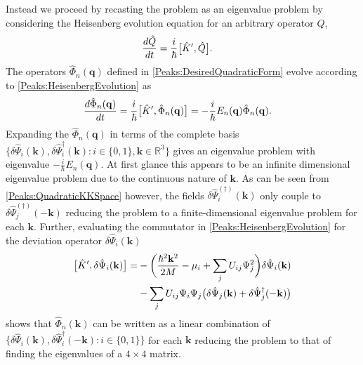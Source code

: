 Instead we proceed by recasting the problem as an eigenvalue problem by considering the Heisenberg evolution equation for an arbitrary operator $\hat{Q}$,
\begin{align}
    \frac{d \hat{Q}}{dt} &= \frac{i}{\hbar}\comm{\hat{K}', \hat{Q}}. \label{Peaks:HeisenbergEvolution}
\end{align}
The operators $\hat{\Phi}_n(\mathbf{q})$ defined in \eqref{Peaks:DesiredQuadraticForm} evolve according to \eqref{Peaks:HeisenbergEvolution} as
\begin{align}
    \frac{d \hat{\Phi}_n(\mathbf{q})}{dt} &= \frac{i}{\hbar}\big[\hat{K}', \hat{\Phi}_n(\mathbf{q})\big] = - \frac{i}{\hbar} E_n(\mathbf{q}) \hat{\Phi}_n(\mathbf{q}).
\end{align}
Expanding the $\hat{\Phi}_n(\mathbf{q})$ in terms of the complete basis $\big\{\delta\hat{\Psi}_i(\mathbf{k}), \delta\hat{\Psi}_i^\dagger(\mathbf{k}): i \in \{0, 1\}, \mathbf{k} \in \mathbb{R}^3\big\}$ gives an eigenvalue problem with eigenvalue $-\frac{i}{\hbar}E_n(\mathbf{q})$.  At first glance this appears to be an infinite dimensional eigenvalue problem due to the continuous nature of $\mathbf{k}$. As can be seen from \eqref{Peaks:QuadraticKKSpace} however, the fields $\delta\hat{\Psi}_i^{(\dagger)}(\mathbf{k})$ only couple to  $\delta\hat{\Psi}_j^{(\dagger)}(-\mathbf{k})$ reducing the problem to a finite-dimensional eigenvalue problem for each $\mathbf{k}$. Further, evaluating the commutator in \eqref{Peaks:HeisenbergEvolution} for the deviation operator $\delta\hat{\Psi}_i(\mathbf{k})$
\begin{align}
    \begin{split}
        \big[\hat{K}', \delta\hat{\Psi}_i(\mathbf{k})\big] =& -\bigg(\frac{\hbar^2 \mathbf{k}^2}{2M} - \mu_i + \sum_j U_{ij} \Psi_j^2\bigg) \delta\hat{\Psi}_i(\mathbf{k})\\
        &- \sum_j U_{ij} \Psi_i \Psi_j \big(\delta\hat{\Psi}_j(\mathbf{k}) + \delta\hat{\Psi}_j^\dagger(-\mathbf{k})\big)
    \end{split}
\end{align}
shows that $\hat{\Phi}_n(\mathbf{k})$ can be written as a linear combination of $\big\{\delta\hat{\Psi}_i(\mathbf{k}), \delta\hat{\Psi}_i^\dagger(-\mathbf{k}) : i \in \{0, 1\}\big\}$ for each $\mathbf{k}$ reducing the problem to that of finding the eigenvalues of a $4\times 4$ matrix.

